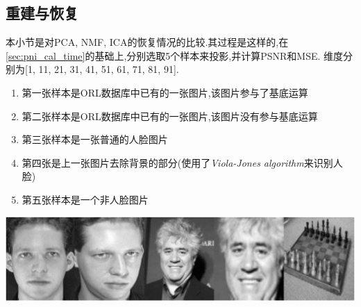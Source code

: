 \subsection{重建与恢复}
\label{sec:pni_recon}
本小节是对PCA, NMF, ICA的恢复情况的比较.其过程是这样的,在\ref{sec:pni_cal_time}的基础上,分别选取5个样本来投影,并计算PSNR和MSE. 维度分别为[1, 11, 21, 31, 41, 51, 61, 71, 81, 91].
\begin{enumerate}
	\item 第一张样本是ORL数据库中已有的一张图片,该图片参与了基底运算
	\item 第二张样本是ORL数据库中已有的一张图片,该图片没有参与基底运算
	\item 第三张样本是一张普通的人脸图片
	\item 第四张是上一张图片去除背景的部分(使用了\textit{Viola-Jones algorithm}来识别人脸)
	\item 第五张样本是一个非人脸图片
\end{enumerate}

	\begin{center}
	\begin{minipage}[t]{\linewidth}
	\center
	{
	\includegraphics[width=\MyFactor\textwidth]{Img/pni_recon} 
	}
	\end{minipage}
	\medskip
	\end{center}

